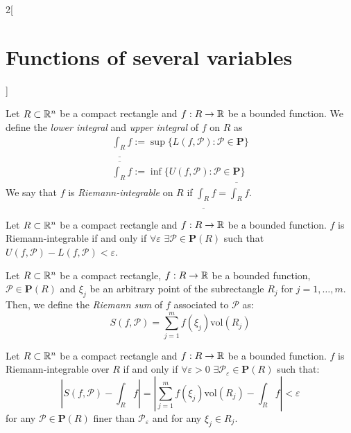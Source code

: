 \documentclass[../../../main_math.tex]{subfiles}
\begin{document}
\begin{multicols}{2}[\section{Functions of several variables}]
\begin{definition}
  \end{definition}
  \begin{definition}
    Let $R\subset\mathbb{R}^n$ be a compact rectangle and $f:R\rightarrow\mathbb{R} $ be a bounded function. We define the \emph{lower integral} and \emph{upper integral} of $f$ on $R$ as
    \begin{gather*}
      \underline{\int_{R}}f:=\sup\{L(f,\mathcal{P}):\mathcal{P}\in\textbf{P}\}\\
      \overline{\int_{R}}f:=\inf\{U(f,\mathcal{P}):\mathcal{P}\in\textbf{P}\}
    \end{gather*} We say that $f$ is \emph{Riemann-integrable} on $R$ if $\displaystyle\underline{\int_{R}}f=\overline{\int_{R}}f$.
  \end{definition}
  \begin{proposition}
    Let $R\subset\mathbb{R}^n$ be a compact rectangle and $f:R\rightarrow\mathbb{R} $ be a bounded function. $f$ is Riemann-integrable if and only if $\forall\varepsilon$ $\exists\mathcal{P}\in\textbf{P}(R)$ such that $U(f,\mathcal{P})-L(f,\mathcal{P})<\varepsilon$.
  \end{proposition}
  \begin{definition}
    Let $R\subset\mathbb{R}^n$ be a compact rectangle, $f:R\rightarrow\mathbb{R} $ be a bounded function, $\mathcal{P}\in\textbf{P}(R)$ and $\xi_j$ be an arbitrary point of the subrectangle $R_j$ for $j=1,\ldots,m$. Then, we define the \emph{Riemann sum} of $f$ associated to $\mathcal{P}$ as: $$S(f,\mathcal{P})=\sum_{j=1}^mf(\xi_j)\text{vol}(R_j)$$
  \end{definition}
  \begin{theorem}
    Let $R\subset\mathbb{R}^n$ be a compact rectangle and $f:R\rightarrow\mathbb{R} $ be a bounded function. $f$ is Riemann-integrable over $R$ if and only if $\forall\varepsilon>0$ $\exists\mathcal{P}_\varepsilon\in\textbf{P}(R)$ such that: $$\left|S(f,\mathcal{P})-\int_Rf\right|=\left|\sum_{j=1}^mf(\xi_j)\text{vol}(R_j)-\int_Rf\right|<\varepsilon$$ for any $\mathcal{P}\in\textbf{P}(R)$ finer than $\mathcal{P}_\varepsilon$ and for any $\xi_j\in R_j$.
  \end{theorem}

\end{multicols}
\end{document}
